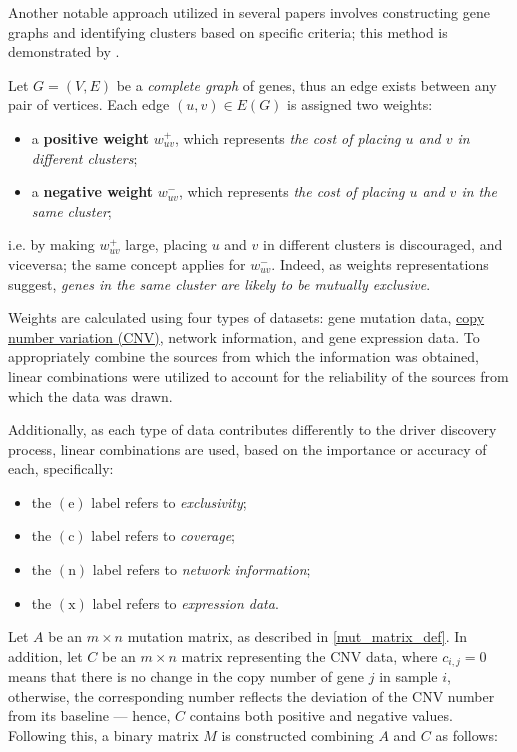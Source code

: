 Another notable approach utilized in several papers involves constructing gene graphs and identifying clusters based on specific criteria; this method is demonstrated by \textcite{c3}.

Let $G = (V, E)$ be a \textit{complete graph} of genes, thus an edge exists between any pair of vertices. Each edge $(u, v) \in E(G)$ is assigned two weights:

\begin{itemize}
    \item a \textbf{positive weight} $w_{uv}^+$, which represents \textit{the cost of placing $u$ and $v$ in different clusters};
    \item a \textbf{negative weight} $w_{uv}^-$, which represents \textit{the cost of placing $u$ and $v$ in the same cluster};
\end{itemize}

i.e. by making $w_{uv}^+$ large, placing $u$ and $v$ in different clusters is discouraged, and viceversa; the same concept applies for $w_{uv}^-$. Indeed, as weights representations suggest, \textit{genes in the same cluster are likely to be mutually exclusive}.

Weights are calculated using four types of datasets: gene mutation data, \href{https://www.genome.gov/genetics-glossary/Copy-Number-Variation}{copy number variation (CNV)}, network information, and gene expression data. To appropriately combine the sources from which the information was obtained, linear combinations were utilized to account for the reliability of the sources from which the data was drawn.

Additionally, as each type of data contributes differently to the driver discovery process, linear combinations are used, based on the importance or accuracy of each, specifically:

\begin{itemize}
    \item the $(\mathrm e)$ label refers to \textit{exclusivity};
    \item the $(\mathrm c)$ label refers to \textit{coverage};
    \item the $(\mathrm n)$ label refers to \textit{network information};
    \item the $(\mathrm x)$ label refers to \textit{expression data}.
\end{itemize}

Let $A$ be an $m \times n$ mutation matrix, as described in \cref{mut_matrix_def}. In addition, let $C$ be an $m \times n$ matrix representing the CNV data, where $c_{i, j} = 0$ means that there is no change in the copy number of gene $j$ in sample $i$, otherwise, the corresponding number reflects the deviation of the CNV number from its baseline --- hence, $C$ contains both positive and negative values. Following this, a binary matrix $M$ is constructed combining $A$ and $C$ as follows:

